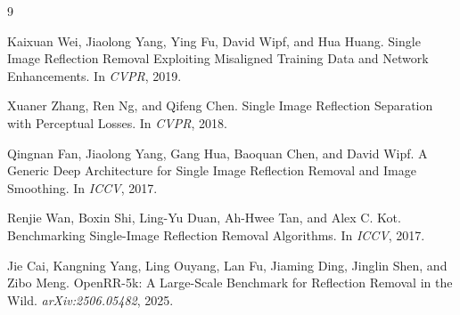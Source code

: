 \documentclass{article}
\begin{document}
\begin{thebibliography}{9}

Kaixuan Wei, Jiaolong Yang, Ying Fu, David Wipf, and Hua Huang.
\newblock Single Image Reflection Removal Exploiting Misaligned Training Data and Network Enhancements.
\newblock In \emph{CVPR}, 2019.

Xuaner Zhang, Ren Ng, and Qifeng Chen.
\newblock Single Image Reflection Separation with Perceptual Losses.
\newblock In \emph{CVPR}, 2018.

Qingnan Fan, Jiaolong Yang, Gang Hua, Baoquan Chen, and David Wipf.
\newblock A Generic Deep Architecture for Single Image Reflection Removal and Image Smoothing.
\newblock In \emph{ICCV}, 2017.

Renjie Wan, Boxin Shi, Ling-Yu Duan, Ah-Hwee Tan, and Alex C. Kot.
\newblock Benchmarking Single-Image Reflection Removal Algorithms.
\newblock In \emph{ICCV}, 2017.

Jie Cai, Kangning Yang, Ling Ouyang, Lan Fu, Jiaming Ding, Jinglin Shen, and Zibo Meng.
\newblock OpenRR-5k: A Large-Scale Benchmark for Reflection Removal in the Wild.
\newblock \emph{arXiv:2506.05482}, 2025.

\end{thebibliography}
\end{document}

